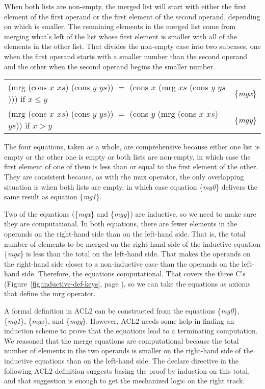When both lists are non-empty, the merged list will
start with either the first element of the first operand
or the first element of the second operand,
depending on which is smaller.
The remaining elements in the merged list come from
merging what's left of the list whose first element is smaller
with all of the elements in the other list.
That divides the non-empty case into two
subcases, one when the first operand starts with a smaller number
than the second operand
and the other when the second operand begins the smaller number.

\begin{center}
\begin{tabular}{ll}
\textsf{(mrg (cons $x$ $xs$) (cons $y$ $ys$)) $=$ (cons $x$ (mrg $xs$ (cons $y$ $ys$)))} if $x \le y$ & \{\emph{mgx}\} \\
\textsf{(mrg (cons $x$ $xs$) (cons $y$ $ys$)) $=$ (cons $y$ (mrg (cons $x$ $xs$) $ys$))} if $x > y$   & \{\emph{mgy}\} \\
\end{tabular}
\end{center}

The four equations, taken as a whole, are comprehensive
because either one list is empty or the other one is empty
or both lists are non-empty,
in which case the first element of one of them
is less than or equal to the first element of the other.
They are consistent because, as with the \textsf{mux} operator,
the only overlapping situation is when
both lists are empty, in which case equation \{\emph{mg0}\}
delivers the same result as equation \{\emph{mg1}\}.

Two of the equations (\{\emph{mgx}\} and \{\emph{mgy}\}) are inductive,
so we need to make sure they are computational.
In both equations, there are fewer elements in the operands
on the right-hand side than on the left-hand side.
That is, the total number of elements to be merged
on the right-hand side of the inductive equation \{\emph{mgx}\}
is less than the total on the left-hand side.
That makes the operands on the right-hand side closer to
a non-inductive case than the operands on the left-hand side.
Therefore, the equations computational.
That covers the three C's
(Figure~\ref{fig:inductive-def-keys}, page \pageref{fig:inductive-def-keys}),
so we can take the equations as axioms that define the \textsf{mrg} operator.

A formal definition in ACL2 can be constructed from
the equations \{\emph{mg0}\}, \{\emph{mg1}\}, \{\emph{mgx}\}, and \{\emph{mgy}\}.
However, ACL2 needs some help in finding an induction scheme
to prove that the equations lead to a terminating computation.
We reasoned that the merge equations are computational
because the total number of elements in the two operands
is smaller on the right-hand side of the inductive equations
than on the left-hand side.
The \textsf{declare} directive in the following ACL2 definition suggests
basing the proof by induction on this total,
and that suggestion is enough to get the mechanized logic on the right track.

